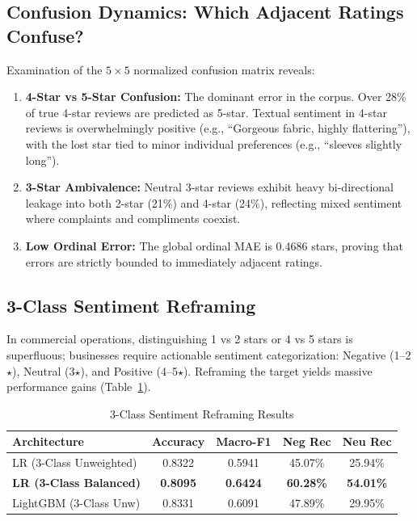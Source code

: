 \documentclass[conference]{IEEEtran}
\begin{document}
\subsection{Confusion Dynamics: Which Adjacent Ratings Confuse?}
Examination of the $5 \times 5$ normalized confusion matrix reveals:
\begin{enumerate}
    \item \textbf{4-Star vs 5-Star Confusion:} The dominant error in the corpus. Over 28\% of true 4-star reviews are predicted as 5-star. Textual sentiment in 4-star reviews is overwhelmingly positive (e.g., ``Gorgeous fabric, highly flattering''), with the lost star tied to minor individual preferences (e.g., ``sleeves slightly long'').
    \item \textbf{3-Star Ambivalence:} Neutral 3-star reviews exhibit heavy bi-directional leakage into both 2-star (21\%) and 4-star (24\%), reflecting mixed sentiment where complaints and compliments coexist.
    \item \textbf{Low Ordinal Error:} The global ordinal MAE is 0.4686 stars, proving that errors are strictly bounded to immediately adjacent ratings.
\end{enumerate}

\subsection{3-Class Sentiment Reframing}
In commercial operations, distinguishing 1 vs 2 stars or 4 vs 5 stars is superfluous; businesses require actionable sentiment categorization: Negative (1–2$\star$), Neutral (3$\star$), and Positive (4–5$\star$). Reframing the target yields massive performance gains (Table~\ref{tab:reframing}).

\begin{table}[htbp]
\caption{3-Class Sentiment Reframing Results}
\label{tab:reframing}
\centering
\begin{tabular}{lcccc}
\toprule
\textbf{Architecture} & \textbf{Accuracy} & \textbf{Macro-F1} & \textbf{Neg Rec} & \textbf{Neu Rec} \\
\midrule
LR (3-Class Unweighted) & 0.8322 & 0.5941 & 45.07\% & 25.94\% \\
\textbf{LR (3-Class Balanced)} & \textbf{0.8095} & \textbf{0.6424} & \textbf{60.28\%} & \textbf{54.01\%} \\
LightGBM (3-Class Unw) & 0.8331 & 0.6091 & 47.89\% & 29.95\% \\
\bottomrule
\end{tabular}
\end{table}
\end{document}
